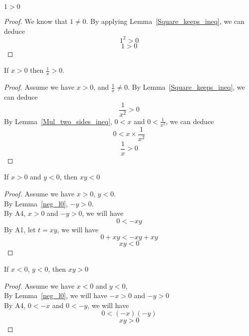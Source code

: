 \documentclass[a4paper]{article}
\begin{document}
\begin{ncor}\label{1>0}
$1 > 0$
\end{ncor}
\begin{proof}
We know that $1 \neq 0$. By applying Lemma~\ref{Square_keeps_ineq}, we can deduce
$$1^2 > 0$$
$$1 > 0$$
\end{proof}

\begin{nlemma}\label{inverse_g0}
If $x > 0$ then $\frac{1}{x} > 0$.
\end{nlemma}
\begin{proof}
Assume we have $x > 0$, and $\frac{1}{x} \neq 0$.
By Lemma~\ref{Square_keeps_ineq}, we can deduce$$\frac{1}{x^2} > 0$$
By Lemma~\ref{Mul_two_sides_ineq}, $0 < x$ and $0 < \frac{1}{x^2}$, we can deduce
$$0 < x \times \frac{1}{x^2}$$
$$\frac{1}{x} > 0$$
\end{proof}

\begin{nlemma}\label{PosNegHaveNeg}
If $x > 0$ and $y < 0$, then $xy < 0$
\end{nlemma}
\begin{proof}
Assume we have $x > 0$, $y < 0$.\\
By Lemma~\ref{neg_l0}, $-y > 0$.\\
By A4, $x > 0$ and $-y > 0$, we will have $$0 < -xy$$
By A1, let $t = xy$, we will have $$0 + xy < -xy + xy$$
$$xy < 0$$
\end{proof}

\begin{nlemma}\label{NegNegHavePos}
If $x < 0$, $y < 0$, then $xy > 0$
\end{nlemma}
\begin{proof}
Assume we have $x < 0$ and $y < 0$,\\
By Lemma~\ref{neg_l0}, we will have $-x > 0$ and $-y > 0$\\
By A4, $0 < -x$ and $0 < -y$, we will have $$0 < (-x)(-y)$$
$$xy > 0$$
\end{proof}
\end{document}
